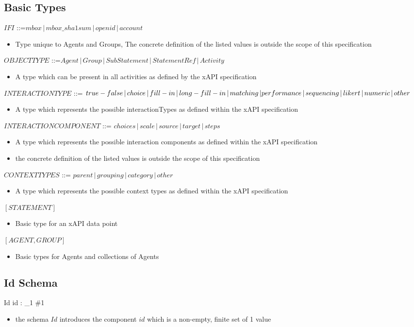 \documentclass{article}
\begin{document}
\subsection{Basic Types}
$IFI$ ::=$ mbox \,|\, mbox\_sha1sum \,|\, openid \,|\, account$
\begin{itemize}
\item Type unique to Agents and Groups, The concrete definition of the listed values
  is outside the scope of this specification
\end{itemize}
$OBJECTTYPE$ ::=$ Agent \,|\, Group \,|\, SubStatement \,|\,
StatementRef \,|\, Activity$
\begin{itemize}
\item A type which can be present in all activities as defined by
  the xAPI specification
\end{itemize}
$INTERACTIONTYPE$ ::= $true-false \,|\, choice \,|\, fill-in \,|\,
long-fill-in \,|\, matching \,| \\ performance \,|\, sequencing \,|\,
likert \,|\, numeric \,|\, other$
\begin{itemize}
\item A type which represents the possible interactionTypes as
  defined within the xAPI specification
\end{itemize}
$INTERACTIONCOMPONENT$ ::= $choices \,|\, scale \,|\, source \,|\,
target \,|\, steps$
\begin{itemize}
\item A type which represents the possible interaction components as
  defined within the xAPI specification
\item the concrete definition of the listed values is outside the
  scope of this specification
\end{itemize}
$CONTEXTTYPES$ ::= $parent \,|\, grouping \,|\, category \,|\, other$
\begin{itemize}
\item A type which represents the possible context types as
  defined within the xAPI specification
\end{itemize}
$[STATEMENT]$
\begin{itemize}
\item Basic type for an xAPI data point
\end{itemize}
$[AGENT, GROUP]$
\begin{itemize}
\item Basic types for Agents and collections of Agents
\end{itemize}

\subsection{Id Schema}
\begin{schema}{Id}
  id : \finset_1 \#1
\end{schema}
\begin{itemize}
\item the schema $Id$ introduces the component $id$ which is a
  non-empty, finite set of 1 value
\end{itemize}
\end{document}
